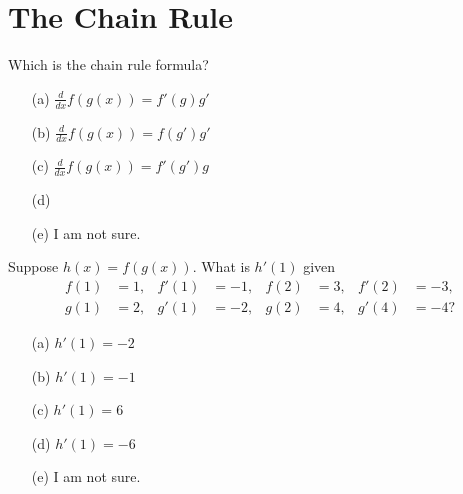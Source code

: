 \documentclass[14pt]{beamer}
\begin{document}
\section{The Chain Rule}
\begin{frame}
  Which is the chain rule formula?

  \medskip
  \begin{itemize} \setlength\itemsep{2ex}
    \item[(a)] \(\tfrac{d}{dx} f(g(x)) = f'(g)g'\)
    \item[(b)] \(\tfrac{d}{dx} f(g(x)) = f(g')g'\)
    \item[(c)] \(\tfrac{d}{dx} f(g(x)) = f'(g')g\)
    \item[(d)] 
    \item[(e)] I am not sure.
  \end{itemize} 
\end{frame}

\begin{frame}
  Suppose \(h(x) = f(g(x))\). What is \(h'(1)\) given
  \begin{align*}
    f(1) &= 1,& f'(1) &= -1, &f(2) &= 3, & f'(2) &= -3, \\
    g(1) &= 2,& g'(1) &= -2, &g(2) &= 4, & g'(4) &= -4?
  \end{align*}

  \medskip
  \begin{itemize} \setlength\itemsep{2ex}
    \item[(a)] \(h'(1) = -2\)
    \item[(b)] \(h'(1) = -1\)
    \item[(c)] \(h'(1) = 6\)
    \item[(d)] \(h'(1) = -6\)
    \item[(e)] I am not sure.
  \end{itemize} 
\end{frame}
\end{document}
